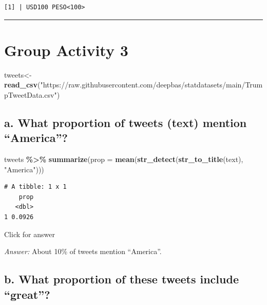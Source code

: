 \documentclass[
]{book}
\newenvironment{Shaded}{\begin{snugshade}}{\end{snugshade}}
\newcommand{\AttributeTok}[1]{\textcolor[rgb]{0.13,0.29,0.53}{#1}}
\newcommand{\FunctionTok}[1]{\textcolor[rgb]{0.13,0.29,0.53}{\textbf{#1}}}
\newcommand{\NormalTok}[1]{#1}
\newcommand{\OtherTok}[1]{\textcolor[rgb]{0.56,0.35,0.01}{#1}}
\newcommand{\SpecialCharTok}[1]{\textcolor[rgb]{0.81,0.36,0.00}{\textbf{#1}}}
\newcommand{\StringTok}[1]{\textcolor[rgb]{0.31,0.60,0.02}{#1}}
\begin{document}
\begin{verbatim}
[1] | USD100 PESO<100>
\end{verbatim}

\begin{center}\rule{0.5\linewidth}{0.5pt}\end{center}

\hypertarget{group-activity-3}{%
\section{Group Activity 3}\label{group-activity-3}}

\begin{Shaded}
\begin{Highlighting}[]
\NormalTok{tweets}\OtherTok{\textless{}{-}} \FunctionTok{read\_csv}\NormalTok{(}\StringTok{"https://raw.githubusercontent.com/deepbas/statdatasets/main/TrumpTweetData.csv"}\NormalTok{)}
\end{Highlighting}
\end{Shaded}

\hypertarget{a.-what-proportion-of-tweets-text-mention-america}{%
\subsection{a. What proportion of tweets (text) mention ``America''?}\label{a.-what-proportion-of-tweets-text-mention-america}}

\begin{Shaded}
\begin{Highlighting}[]
\NormalTok{tweets }\SpecialCharTok{\%\textgreater{}\%} 
  \FunctionTok{summarize}\NormalTok{(}\AttributeTok{prop =} \FunctionTok{mean}\NormalTok{(}\FunctionTok{str\_detect}\NormalTok{(}\FunctionTok{str\_to\_title}\NormalTok{(text), }\StringTok{"America"}\NormalTok{))) }
\end{Highlighting}
\end{Shaded}

\begin{verbatim}
# A tibble: 1 x 1
    prop
   <dbl>
1 0.0926
\end{verbatim}

Click for answer

\emph{Answer:} About 10\% of tweets mention ``America''.

\hypertarget{b.-what-proportion-of-these-tweets-include-great}{%
\subsection{b. What proportion of these tweets include ``great''?}\label{b.-what-proportion-of-these-tweets-include-great}}
\end{document}

